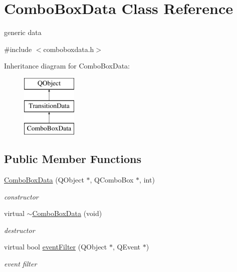 \hypertarget{class_combo_box_data}{}\section{Combo\+Box\+Data Class Reference}
\label{class_combo_box_data}


generic data  




{\ttfamily \#include $<$comboboxdata.\+h$>$}

Inheritance diagram for Combo\+Box\+Data\+:\begin{figure}[H]
\begin{center}
\leavevmode
\includegraphics[height=3.000000cm]{class_combo_box_data}
\end{center}
\end{figure}
\subsection*{Public Member Functions}
\begin{DoxyCompactItemize}
\item 
\mbox{\label{class_combo_box_data_a07ead72f2c7e29b4172e97710a1b5b90}} 
\hyperlink{class_combo_box_data_a07ead72f2c7e29b4172e97710a1b5b90}{Combo\+Box\+Data} (Q\+Object $\ast$, Q\+Combo\+Box $\ast$, int)
\begin{DoxyCompactList}\small\item\em constructor \end{DoxyCompactList}\item 
\mbox{\label{class_combo_box_data_a22257bc48baf37f19c49566aafd6fc0a}} 
virtual \hyperlink{class_combo_box_data_a22257bc48baf37f19c49566aafd6fc0a}{$\sim$\+Combo\+Box\+Data} (void)
\begin{DoxyCompactList}\small\item\em destructor \end{DoxyCompactList}\item 
\mbox{\label{class_combo_box_data_abe8cd1e5ace75bf89549503a5da2c594}} 
virtual bool \hyperlink{class_combo_box_data_abe8cd1e5ace75bf89549503a5da2c594}{event\+Filter} (Q\+Object $\ast$, Q\+Event $\ast$)
\begin{DoxyCompactList}\small\item\em event filter \end{DoxyCompactList}\end{DoxyCompactItemize}

